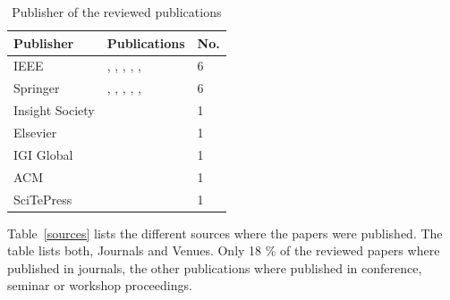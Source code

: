\documentclass[runningheads]{llncs}
\begin{document}
\begin{table}
    \centering
    \caption{Publisher of the reviewed publications}
    \begin{tabular}{ | l | l | l | }
        \hline
        \textbf{Publisher} & \textbf{Publications}                                                                                                                             & \textbf{No.} \\
        \hline
        \hline
        IEEE               & \cite{Silalahi20221}, \cite{MacAk2020}, \cite{Zaman20192982}, \cite{Mishra2018613}, \cite{Talamo2013}, \cite{Mardani2013}                         & 6            \\
        \hline
        Springer           & \cite{Breitmayer202411}, \cite{MozafariMehr2022397}, \cite{MozafariMehr202182}, \cite{Sarno2020}, \cite{Zahoransky2014360}, \cite{Leitner2013719} & 6            \\
        \hline
        Insight Society    & \cite{Yunizal20221387}                                                                                                                            & 1            \\
        \hline
        Elsevier           & \cite{Fazzinga2020}                                                                                                                               & 1            \\
        \hline
        IGI Global         & \cite{Zhu201783}                                                                                                                                  & 1            \\
        \hline
        ACM                & \cite{Accorsi20131462}                                                                                                                            & 1            \\
        \hline
        SciTePress         & \cite{Dedousis202235}                                                                                                                             & 1            \\
        \hline
    \end{tabular}
    \label{Publisher}
\end{table}
Table~\ref{sources} lists the different sources where the papers were published. The table lists both, Journals and Venues. Only 18 \% of the reviewed papers where published in journals, the
other publications where published in conference, seminar or workshop proceedings.  
\end{document}
